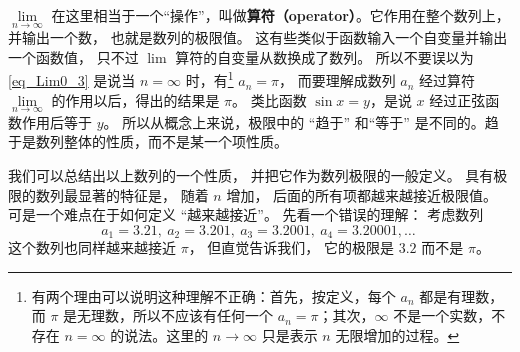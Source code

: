 


$\lim\limits_{n \to \infty }$ 在这里相当于一个“操作”，叫做\textbf{算符（operator）}。它作用在整个数列上，并输出一个数， 也就是数列的极限值。 这有些类似于函数输入一个自变量并输出一个函数值， 只不过 $\lim$ 算符的自变量从数换成了数列。 所以不要误以为\autoref{eq_Lim0_3} 是说当 $n = \infty$ 时，有\footnote{有两个理由可以说明这种理解不正确：首先，按定义，每个 $a_n$ 都是有理数，而 $\pi$ 是无理数，所以不应该有任何一个 $a_n=\pi$；其次，$\infty$ 不是一个实数，不存在 $n=\infty$ 的说法。这里的 $n\to\infty$ 只是表示 $n$ 无限增加的过程。} $a_n=\pi$， 而要理解成数列 $a_n$ 经过算符 $\lim\limits_{n \to \infty }$ 的作用以后，得出的结果是 $\pi$。 类比函数 $\sin x = y$，是说 $x$ 经过正弦函数作用后等于 $y$。 所以从概念上来说，极限中的 “趋于” 和“等于” 是不同的。趋于是数列整体的性质，而不是某一个项性质。

我们可以总结出以上数列的一个性质， 并把它作为数列极限的一般定义。 具有极限的数列最显著的特征是， 随着 $n$ 增加， 后面的所有项都越来越接近极限值。 可是一个难点在于如何定义 “越来越接近”。 先看一个错误的理解： 考虑数列
\begin{equation}\label{eq_Lim0_2}
a_1 = 3.21,\ a_2 = 3.201,\ a_3 = 3.2001,\ a_4 = 3.20001, \dots~
\end{equation}
这个数列也同样越来越接近 $\pi$， 但直觉告诉我们， 它的极限是 $3.2$ 而不是 $\pi$。

